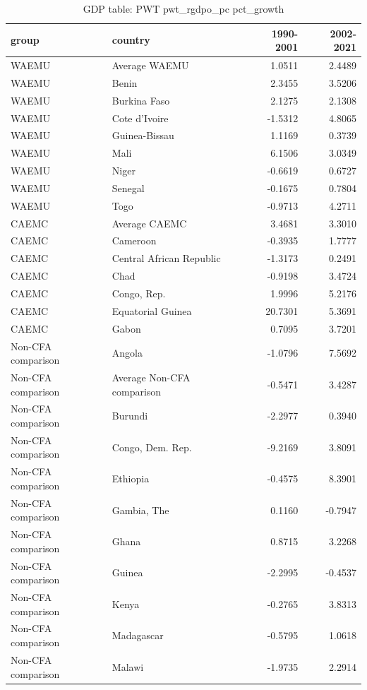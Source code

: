 \begin{table}

\caption{GDP table: PWT pwt_rgdpo_pc pct_growth}
\centering
\begin{tabular}[t]{llrr}
\toprule
group & country & 1990-2001 & 2002-2021\\
\midrule
WAEMU & Average WAEMU & 1.0511 & 2.4489\\
WAEMU & Benin & 2.3455 & 3.5206\\
WAEMU & Burkina Faso & 2.1275 & 2.1308\\
WAEMU & Cote d'Ivoire & -1.5312 & 4.8065\\
WAEMU & Guinea-Bissau & 1.1169 & 0.3739\\
\addlinespace
WAEMU & Mali & 6.1506 & 3.0349\\
WAEMU & Niger & -0.6619 & 0.6727\\
WAEMU & Senegal & -0.1675 & 0.7804\\
WAEMU & Togo & -0.9713 & 4.2711\\
CAEMC & Average CAEMC & 3.4681 & 3.3010\\
\addlinespace
CAEMC & Cameroon & -0.3935 & 1.7777\\
CAEMC & Central African Republic & -1.3173 & 0.2491\\
CAEMC & Chad & -0.9198 & 3.4724\\
CAEMC & Congo, Rep. & 1.9996 & 5.2176\\
CAEMC & Equatorial Guinea & 20.7301 & 5.3691\\
\addlinespace
CAEMC & Gabon & 0.7095 & 3.7201\\
Non-CFA comparison & Angola & -1.0796 & 7.5692\\
Non-CFA comparison & Average Non-CFA comparison & -0.5471 & 3.4287\\
Non-CFA comparison & Burundi & -2.2977 & 0.3940\\
Non-CFA comparison & Congo, Dem. Rep. & -9.2169 & 3.8091\\
\addlinespace
Non-CFA comparison & Ethiopia & -0.4575 & 8.3901\\
Non-CFA comparison & Gambia, The & 0.1160 & -0.7947\\
Non-CFA comparison & Ghana & 0.8715 & 3.2268\\
Non-CFA comparison & Guinea & -2.2995 & -0.4537\\
Non-CFA comparison & Kenya & -0.2765 & 3.8313\\
\addlinespace
Non-CFA comparison & Madagascar & -0.5795 & 1.0618\\
Non-CFA comparison & Malawi & -1.9735 & 2.2914\\

\end{tabular}
\end{table}
